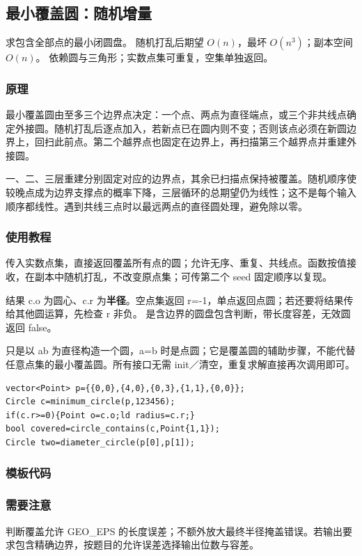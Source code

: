 \subsection{最小覆盖圆：随机增量}
\label{geo:enclosing-circle}
\AlgorithmInfo
    {求包含全部点的最小闭圆盘。}
    {随机打乱后期望 $O(n)$，最坏 $O(n^3)$；副本空间 $O(n)$。}
    {依赖圆与三角形；实数点集可重复，空集单独返回。}
\subsubsection*{原理}

最小覆盖圆由至多三个边界点决定：一个点、两点为直径端点，或三个非共线点确定外接圆。随机打乱后逐点加入，若新点已在圆内则不变；否则该点必须在新圆边界上，回扫此前点。第二个越界点也固定在边界上，再扫描第三个越界点并重建外接圆。

一、二、三层重建分别固定对应的边界点，其余已扫描点保持被覆盖。随机顺序使较晚点成为边界支撑点的概率下降，三层循环的总期望仍为线性；这不是每个输入顺序都线性。遇到共线三点时以最远两点的直径圆处理，避免除以零。

\subsubsection*{使用教程}
 传入实数点集，直接返回覆盖所有点的圆；允许无序、重复、共线点。函数按值接收，在副本中随机打乱，不改变原点集；可传第二个  seed 固定顺序以复现。

结果 c.o 为圆心、c.r 为\textbf{半径}。空点集返回 r=-1，单点返回点圆；若还要将结果传给其他圆运算，先检查 r 非负。 是含边界的圆盘包含判断，带长度容差，无效圆返回 false。

 只是以 ab 为直径构造一个圆，a=b 时是点圆；它是覆盖圆的辅助步骤，不能代替任意点集的最小覆盖圆。所有接口无需 init／清空，重复求解直接再次调用即可。
\begin{lstlisting}[style=mtycpp,numbers=none]
vector<Point> p={{0,0},{4,0},{0,3},{1,1},{0,0}};
Circle c=minimum_circle(p,123456);
if(c.r>=0){Point o=c.o;ld radius=c.r;}
bool covered=circle_contains(c,Point{1,1});
Circle two=diameter_circle(p[0],p[1]);
\end{lstlisting}
\subsubsection*{模板代码}
\subsubsection*{需要注意}
判断覆盖允许 GEO\_EPS 的长度误差；不额外放大最终半径掩盖错误。若输出要求包含精确边界，按题目的允许误差选择输出位数与容差。

